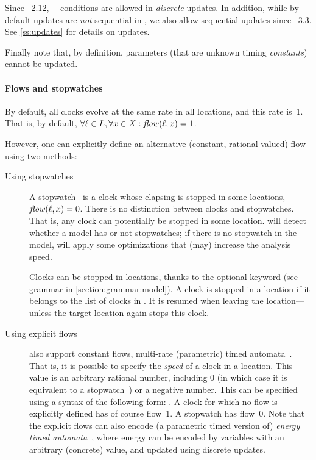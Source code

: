 Since \imitator{}~2.12, -- conditions are allowed in \emph{discrete} updates.
In addition, while by default updates are \emph{not} sequential in \imitator{}, we also allow sequential updates since \imitator{}~3.3.
See \cref{ss:updates} for details on updates.

Finally note that, by definition, parameters (that are unknown timing \emph{constants}) cannot be updated.

\paragraph{Flows and stopwatches}
By default, all clocks evolve at the same rate in all locations, and this rate is~1.
That is, by default, $\forall \ell \in L, \forall x \in X : \mathit{flow}(\ell, x) = 1$.

However, one can explicitly define an alternative (constant, rational-valued) flow using two methods:
\begin{description}
	\item [Using stopwatches]
A stopwatch~\cite{CL00} is a clock whose elapsing is stopped in some locations, \ie{} $\mathit{flow}(\ell, x) = 0$.
There is no distinction between clocks and stopwatches.
That is, any clock can potentially be stopped in some location.
\imitator{} will detect whether a model has or not stopwatches; if there is no stopwatch in the model, \imitator{} will apply some optimizations that (may) increase the analysis speed.

Clocks can be stopped in locations, thanks to the optional  keyword (see grammar in  \cref{section:grammar:model}).
A clock is stopped in a location if it belongs to the list of clocks in .
It is resumed when leaving the location---unless the target location again stops this clock.

\item [Using explicit flows]
\imitator{} also support constant flows, \ie{} multi-rate (parametric) timed automata~\cite{ACHHHNOSY95}.
That is, it is possible to specify the \emph{speed} of a clock in a location.
This value is an arbitrary rational number, including 0 (in which case it is equivalent to a stopwatch~\cite{CL00}) or a negative number.
This can be specified using a syntax of the following form: .
A clock for which no flow is explicitly defined has of course flow~1.
A stopwatch has flow~0.
Note that the explicit flows can also encode (a parametric timed version of) \emph{energy timed automata}~\cite{BFLMS08}, where energy can be encoded by \imitator{} variables with an arbitrary (concrete) value, and updated using discrete updates.
\end{description}



